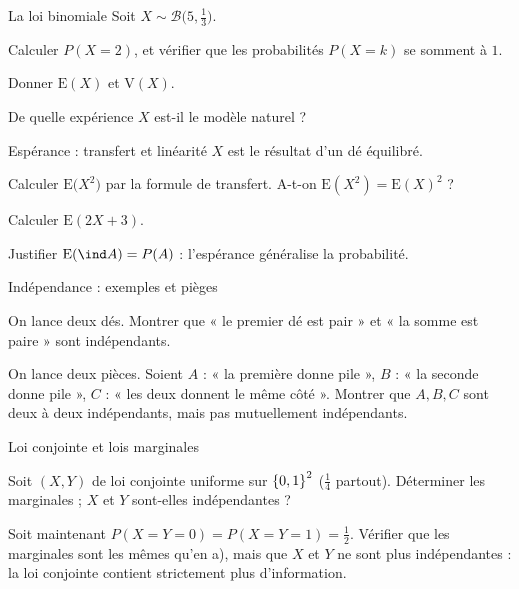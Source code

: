 \begin{exercice}[1]{La loi binomiale}
Soit $X\sim\mathcal{B}\bigl(5,\frac13\bigr)$.
\begin{questions}
  \item Calculer $P(X=2)$, et vérifier que les probabilités
    $P(X=k)$ se somment à $1$.
  \item Donner $\mathrm{E}(X)$ et $\mathrm{V}(X)$.
  \item De quelle expérience $X$ est-il le modèle naturel ?
\end{questions}
\end{exercice}

\begin{exercice}[1]{Espérance : transfert et linéarité}
$X$ est le résultat d'un dé équilibré.
\begin{questions}
  \item Calculer $\mathrm{E}\bigl(X^{2}\bigr)$ par la formule de
    transfert. A-t-on $\mathrm{E}(X^{2})=\mathrm{E}(X)^{2}$ ?
  \item Calculer $\mathrm{E}(2X+3)$.
  \item Justifier $\mathrm{E}(\ind A)=P(A)$ : l'espérance généralise la
    probabilité.
\end{questions}
\end{exercice}


\begin{exercice}[2]{Indépendance : exemples et pièges}
\begin{questions}
  \item On lance deux dés. Montrer que « le premier dé est pair » et « la
    somme est paire » sont indépendants.
  \item On lance deux pièces. Soient $A$ : « la première donne pile »,
    $B$ : « la seconde donne pile », $C$ : « les deux donnent le même
    côté ». Montrer que $A,B,C$ sont deux à deux indépendants, mais pas
    mutuellement indépendants.
\end{questions}
\end{exercice}

\begin{exercice}[2]{Loi conjointe et lois marginales}
\begin{questions}
  \item Soit $(X,Y)$ de loi conjointe uniforme sur
    $\left\{0,1\right\}^{2}$ ($\frac14$ partout). Déterminer les marginales ;
    $X$ et $Y$ sont-elles indépendantes ?
  \item Soit maintenant $P(X=Y=0)=P(X=Y=1)=\frac12$. Vérifier que les
    marginales sont les mêmes qu'en a), mais que $X$ et $Y$ ne sont plus
    indépendantes : la loi conjointe contient strictement plus
    d'information.
\end{questions}
\end{exercice}

